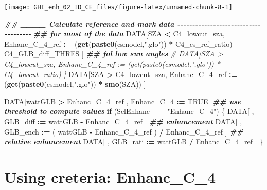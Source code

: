 \documentclass[
  10pt,
  a4paper,oneside]{article}
\newenvironment{Shaded}{\begin{snugshade}}{\end{snugshade}}
\newcommand{\CommentTok}[1]{\textcolor[rgb]{0.56,0.35,0.01}{\textit{#1}}}
\newcommand{\ConstantTok}[1]{\textcolor[rgb]{0.56,0.35,0.01}{#1}}
\newcommand{\ControlFlowTok}[1]{\textcolor[rgb]{0.13,0.29,0.53}{\textbf{#1}}}
\newcommand{\DocumentationTok}[1]{\textcolor[rgb]{0.56,0.35,0.01}{\textbf{\textit{#1}}}}
\newcommand{\FunctionTok}[1]{\textcolor[rgb]{0.13,0.29,0.53}{\textbf{#1}}}
\newcommand{\NormalTok}[1]{#1}
\newcommand{\SpecialCharTok}[1]{\textcolor[rgb]{0.81,0.36,0.00}{\textbf{#1}}}
\newcommand{\StringTok}[1]{\textcolor[rgb]{0.31,0.60,0.02}{#1}}
\begin{document}
\begin{center}\texttt{[image: GHI\_enh\_02\_ID\_CE\_files/figure-latex/unnamed-chunk-8-1]} \end{center}

\begin{Shaded}
\begin{Highlighting}[]
\DocumentationTok{\#\# \_\_\_\_ Calculate reference and mark data  {-}{-}{-}{-}{-}{-}{-}{-}{-}{-}{-}{-}{-}{-}{-}{-}{-}{-}{-}{-}{-}{-}{-}{-}{-}{-}{-}{-}{-}{-}{-}{-}{-}{-}{-}{-}{-}}
\DocumentationTok{\#\# for most of the data}
\NormalTok{DATA[SZA }\SpecialCharTok{\textless{}}\NormalTok{ C4\_lowcut\_sza, Enhanc\_C\_4\_ref }\SpecialCharTok{:=}\NormalTok{ (}\FunctionTok{get}\NormalTok{(}\FunctionTok{paste0}\NormalTok{(csmodel,}\StringTok{".glo"}\NormalTok{)) }\SpecialCharTok{*}\NormalTok{ C4\_cs\_ref\_ratio) }\SpecialCharTok{+}\NormalTok{ C4\_GLB\_diff\_THRES ]}
\DocumentationTok{\#\# fol low sun angles}
\CommentTok{\# DATA[SZA \textgreater{} C4\_lowcut\_sza, Enhanc\_C\_4\_ref := (get(paste0(csmodel,".glo")) * C4\_lowcut\_ratio) ]}
\NormalTok{DATA[SZA }\SpecialCharTok{\textgreater{}}\NormalTok{ C4\_lowcut\_sza, Enhanc\_C\_4\_ref }\SpecialCharTok{:=}\NormalTok{ (}\FunctionTok{get}\NormalTok{(}\FunctionTok{paste0}\NormalTok{(csmodel,}\StringTok{".glo"}\NormalTok{)) }\SpecialCharTok{*} \FunctionTok{smo}\NormalTok{(SZA)) ]}

\NormalTok{DATA[wattGLB }\SpecialCharTok{\textgreater{}}\NormalTok{ Enhanc\_C\_4\_ref ,}
\NormalTok{     Enhanc\_C\_4 }\SpecialCharTok{:=} \ConstantTok{TRUE}\NormalTok{]}
\DocumentationTok{\#\# use threshold to compute values}
\ControlFlowTok{if}\NormalTok{ (SelEnhanc }\SpecialCharTok{==} \StringTok{"Enhanc\_C\_4"}\NormalTok{) \{}
\NormalTok{    DATA[ , GLB\_diff }\SpecialCharTok{:=}\NormalTok{   wattGLB }\SpecialCharTok{{-}}\NormalTok{ Enhanc\_C\_4\_ref                    ] }\DocumentationTok{\#\# enhancement}
\NormalTok{    DATA[ , GLB\_ench }\SpecialCharTok{:=}\NormalTok{ ( wattGLB }\SpecialCharTok{{-}}\NormalTok{ Enhanc\_C\_4\_ref ) }\SpecialCharTok{/}\NormalTok{ Enhanc\_C\_4\_ref ] }\DocumentationTok{\#\# relative enhancement}
\NormalTok{    DATA[ , GLB\_rati }\SpecialCharTok{:=}\NormalTok{   wattGLB }\SpecialCharTok{/}\NormalTok{ Enhanc\_C\_4\_ref                    ]}
\NormalTok{\}}
\end{Highlighting}
\end{Shaded}

\FloatBarrier

\hypertarget{using-creteria-enhanc_c_4}{%
\section{Using creteria: Enhanc\_C\_4}\label{using-creteria-enhanc_c_4}}
\end{document}
